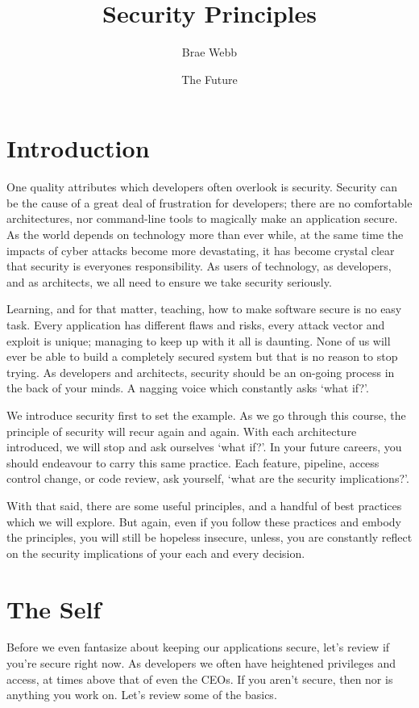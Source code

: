 \documentclass{csse4400}
\title{Security Principles}
\author{Brae Webb}
\date{{\color{red} The Future}}
\begin{document}
\makecover

\maketitle

\section{Introduction}

One quality attributes which developers often overlook is security.
Security can be the cause of a great deal of frustration for developers;
there are no comfortable architectures, nor command-line tools to magically make an application secure.
As the world depends on technology more than ever while, at the same time the impacts of cyber attacks become more devastating,
it has become crystal clear that security is everyones responsibility.
As users of technology, as developers, and as architects, we all need to ensure we take security seriously.

Learning, and for that matter, teaching, how to make software secure is no easy task.
Every application has different flaws and risks, every attack vector and exploit is unique; managing to keep up with it all is daunting.
None of us will ever be able to build a completely secured system but that is no reason to stop trying.
As developers and architects, security should be an on-going process in the back of your minds.
A nagging voice which constantly asks `what if?'.

We introduce security first to set the example.
As we go through this course, the principle of security will recur again and again.
With each architecture introduced, we will stop and ask ourselves `what if?'.
In your future careers, you should endeavour to carry this same practice.
Each feature, pipeline, access control change, or code review, ask yourself, `what are the security implications?'.

With that said, there are some useful principles, and a handful of best practices which we will explore.
But again, even if you follow these practices and embody the principles,
you will still be hopeless insecure, unless,
you are constantly reflect on the security implications of your each and every decision.

\section{The Self}
Before we even fantasize about keeping our applications secure, let's review if you're secure right now.
As developers we often have heightened privileges and access, at times above that of even the CEOs.
If you aren't secure, then nor is anything you work on.
Let's review some of the basics.
\end{document}
